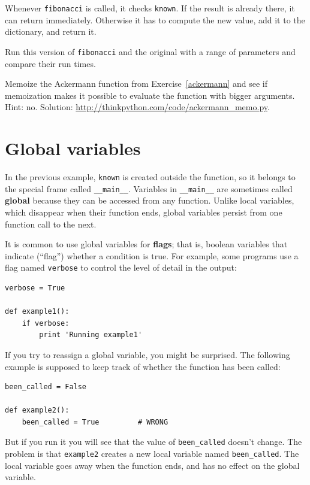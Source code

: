 \documentclass[10pt]{book}
\begin{document}
Whenever {\tt fibonacci} is called, it checks {\tt known}.
If the result is already there, it can return
immediately.  Otherwise it has to 
compute the new value, add it to the dictionary, and return it.

\begin{exercise}

Run this version of {\tt fibonacci} and the original with
a range of parameters and compare their run times.

\end{exercise}

\begin{exercise}

Memoize the Ackermann function from Exercise~\ref{ackermann} and see if
memoization makes it possible to evaluate the function with bigger
arguments.  Hint: no.
Solution: \url{http://thinkpython.com/code/ackermann_memo.py}.

\end{exercise}


\section{Global variables}

In the previous example, {\tt known} is created outside the function,
so it belongs to the special frame called \verb"__main__".
Variables in \verb"__main__" are sometimes called {\bf global}
because they can be accessed from any function.  Unlike local
variables, which disappear when their function ends, global variables
persist from one function call to the next.

It is common to use global variables for {\bf flags}; that is, 
boolean variables that indicate (``flag'') whether a condition
is true.  For example, some programs use
a flag named {\tt verbose} to control the level of detail in the
output:

\begin{verbatim}
verbose = True

def example1():
    if verbose:
        print 'Running example1'
\end{verbatim}
%
If you try to reassign a global variable, you might be surprised.
The following example is supposed to keep track of whether the
function has been called:

\begin{verbatim}
been_called = False

def example2():
    been_called = True         # WRONG
\end{verbatim}
%
But if you run it you will see that the value of \verb"been_called"
doesn't change.  The problem is that {\tt example2} creates a new local
variable named \verb"been_called".  The local variable goes away when
the function ends, and has no effect on the global variable.
\end{document}
